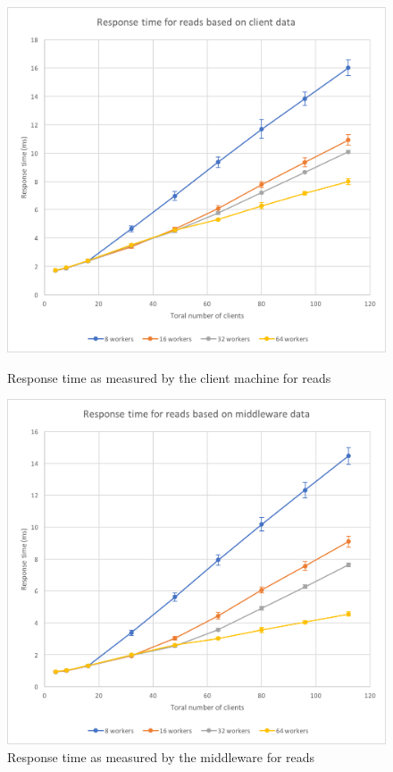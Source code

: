 \documentclass[11pt,a4paper]{article}
\begin{document}
\begin{figure}[!h]
    \centering
    \begin{minipage}[b]{.45\textwidth}
        \centering
        \includegraphics[width=\textwidth]{processing/graphics/bench_1mw_latency-clients_read_cdat.png}
        \caption{Response time as measured by the client machine for reads}
        \label{png::bench_1mw_latency-clients_read_cdat}
    \end{minipage}
    \qquad
    \begin{minipage}[b]{.45\textwidth}
        \centering
        \includegraphics[width=\textwidth]{processing/graphics/bench_1mw_latency-clients_read_mdat.png}
        \caption{Response time as measured by the middleware for reads}
        \label{png::bench_1mw_latency-clients_read_mdat}
    \end{minipage}
\end{figure}
\end{document}
